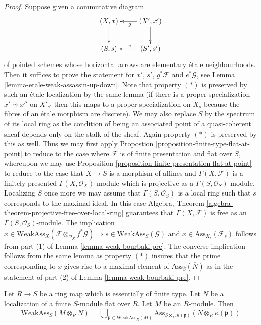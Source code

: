 \begin{proof}
\medskip\noindent
Suppose given a commutative diagram
$$
\xymatrix{
(X, x) \ar[d] & (X', x') \ar[l]^g \ar[d] \\
(S, s) & (S', s') \ar[l]_e
}
$$
of pointed schemes whose horizontal arrows are elementary \'etale
neighbourhoods. Then it suffices to prove the statement for
$x'$, $s'$, $g^*\mathcal{F}$ and $e^*\mathcal{G}$, see
Lemma \ref{lemma-etale-weak-assassin-up-down}.
Note that property $(*)$ is preserved by such an \'etale localization
by the same lemma (if there is a proper specialization 
$x' \leadsto x''$ on $X'_{s'}$ then this maps to a proper
specialization on $X_s$ because the fibres of an \'etale morphism
are discrete). We may also replace $S$ by the spectrum of its local ring
as the condition of being an associated point of a quasi-coherent sheaf
depends only on the stalk of the sheaf. Again property $(*)$ is
preserved by this as well. Thus we may first apply
Propostion \ref{proposition-finite-type-flat-at-point}
to reduce to the case where $\mathcal{F}$ is of finite presentation
and flat over $S$, whereupon we may use
Proposition \ref{proposition-finite-presentation-flat-at-point}
to reduce to the case that $X \to S$ is a morphism of affines
and $\Gamma(X, \mathcal{F})$ is a finitely presented
$\Gamma(X, \mathcal{O}_X)$-module which is projective as a
$\Gamma(S, \mathcal{O}_S)$-module. Localizing $S$ once more we
may assume that $\Gamma(S, \mathcal{O}_S)$ is a local ring such that
$s$ corresponds to the maximal ideal. In this case
Algebra, Theorem \ref{algebra-theorem-projective-free-over-local-ring}
guarantees that $\Gamma(X, \mathcal{F})$ is free as an
$\Gamma(S, \mathcal{O}_S)$-module. The implication
$x \in \text{WeakAss}_X(\mathcal{F} \otimes_{\mathcal{O}_X} f^*\mathcal{G})
\Rightarrow
s \in \text{WeakAss}_S(\mathcal{G})
\text{ and }
x \in \text{Ass}_{X_s}(\mathcal{F}_s)$ follows from part (1) of
Lemma \ref{lemma-weak-bourbaki-pre}.
The converse implication follows from the same lemma as property $(*)$
insures that the prime corresponding
to $x$ gives rise to a maximal element of
$\text{Ass}_{\overline{S}}(\overline{N})$ as in the statement
of part (2) of
Lemma \ref{lemma-weak-bourbaki-pre}.
\end{proof}

\begin{lemma}
\label{lemma-weak-bourbaki}
Let $R \to S$ be a ring map which is essentially of finite type.
Let $N$ be a localization of a finite $S$-module flat over $R$.
Let $M$ be an $R$-module. Then
$$
\text{WeakAss}_S(M \otimes_R N) 
=
\bigcup\nolimits_{\mathfrak p \in \text{WeakAss}_R(M)}
\text{Ass}_{S \otimes_R \kappa(\mathfrak p)}(N \otimes_R \kappa(\mathfrak p))
$$
\end{lemma}


